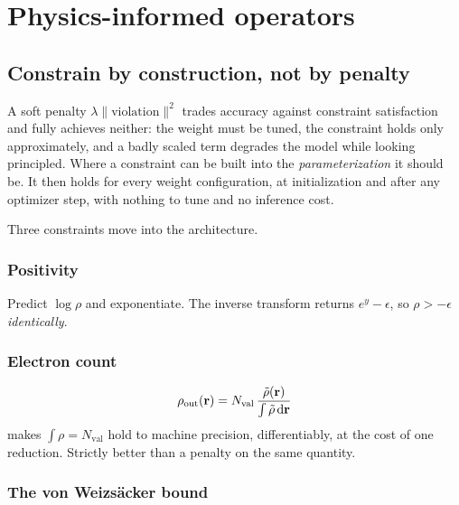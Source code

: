 \chapter{Physics-informed operators}
\label{ch:pifno}

\section{Constrain by construction, not by penalty}

A soft penalty $\lambda\lVert\text{violation}\rVert^2$ trades accuracy against
constraint satisfaction and fully achieves neither: the weight must be tuned,
the constraint holds only approximately, and a badly scaled term degrades the
model while looking principled. Where a constraint can be built into the
\emph{parameterization} it should be. It then holds for every weight
configuration, at initialization and after any optimizer step, with nothing to
tune and no inference cost.

Three constraints move into the architecture.

\subsection{Positivity}

Predict $\log\rho$ and exponentiate. The inverse transform returns
$e^{y}-\epsilon$, so $\rho > -\epsilon$ \emph{identically}.

\subsection{Electron count}

\begin{equation}
  \rho_{\mathrm{out}}(\mathbf{r}) = N_{\mathrm{val}}\,
    \frac{\tilde\rho(\mathbf{r})}{\int \tilde\rho\,\mathrm{d}\mathbf{r}}
\end{equation}
makes $\int\rho = N_{\mathrm{val}}$ hold to machine precision, differentiably,
at the cost of one reduction. Strictly better than a penalty on the same
quantity.

\subsection{The von Weizsäcker bound}
\label{sec:pauli-head}

